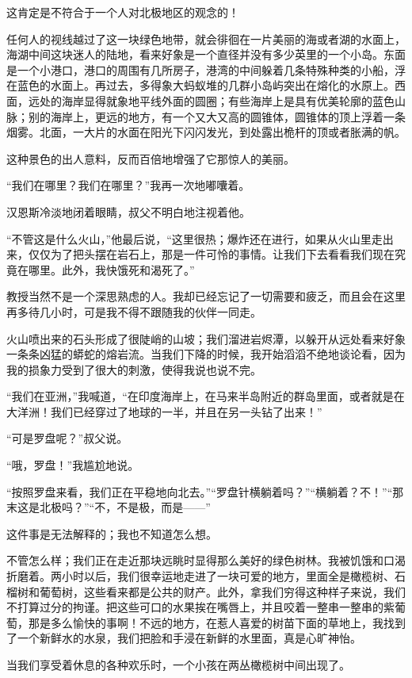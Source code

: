 \documentclass[10pt]{book}
\begin{document}
这肯定是不符合于一个人对北极地区的观念的！

任何人的视线越过了这一块绿色地带，就会徘徊在一片美丽的海或者湖的水面上，海湖中间这块迷人的陆地，看来好象是一个直径并没有多少英里的一个小岛。东面是一个小港口，港口的周围有几所房子，港湾的中间躲着几条特殊种类的小船，浮在蓝色的水面上。再过去，多得象大蚂蚁堆的几群小岛屿突出在熔化的水原上。西面，远处的海岸显得就象地平线外面的圆圈；有些海岸上是具有优美轮廓的蓝色山脉；别的海岸上，更远的地方，有一个又大又高的圆锥体，圆锥体的顶上浮着一条烟雾。北面，一大片的水面在阳光下闪闪发光，到处露出桅杆的顶或者胀满的帆。

这种景色的出人意料，反而百倍地增强了它那惊人的美丽。

“我们在哪里？我们在哪里？”我再一次地嘟囔着。

汉恩斯冷淡地闭着眼睛，叔父不明白地注视着他。

“不管这是什么火山，”他最后说，“这里很热；爆炸还在进行，如果从火山里走出来，仅仅为了把头摆在岩石上，那是一件可怜的事情。让我们下去看看我们现在究竟在哪里。此外，我快饿死和渴死了。”

教授当然不是一个深思熟虑的人。我却已经忘记了一切需要和疲乏，而且会在这里再多待几小时，可是我不得不跟随我的伙伴一同走。

火山喷出来的石头形成了很陡峭的山坡；我们溜进岩烬潭，以躲开从远处看来好象一条条凶猛的蟒蛇的熔岩流。当我们下降的时候，我开始滔滔不绝地谈论看，因为我的损象力受到了很大的刺激，使得我说也说不完。

“我们在亚洲，”我喊道，“在印度海岸上，在马来半岛附近的群岛里面，或者就是在大洋洲！我们已经穿过了地球的一半，并且在另一头钻了出来！”

“可是罗盘呢？”叔父说。

“哦，罗盘！”我尴尬地说。

“按照罗盘来看，我们正在平稳地向北去。”“罗盘针横躺着吗？”“横躺着？不！”“那末这是北极吗？”“不，不是极，而是——”

这件事是无法解释的；我也不知道怎么想。

不管怎么样；我们正在走近那块远眺时显得那么美好的绿色树林。我被饥饿和口渴折磨着。两小时以后，我们很幸运地走进了一块可爱的地方，里面全是橄榄树、石榴树和葡萄树，这些看来都是公共的财产。此外，拿我们穷得这种样子来说，我们不打算过分的拘谨。把这些可口的水果挨在嘴唇上，并且咬着一整串一整串的紫葡萄，那是多么愉快的事啊！不远的地方，在惹人喜爱的树苗下面的草地上，我找到了一个新鲜水的水泉，我们把脸和手浸在新鲜的水里面，真是心旷神怡。

当我们享受着休息的各种欢乐时，一个小孩在两丛橄榄树中间出现了。
\end{document}
